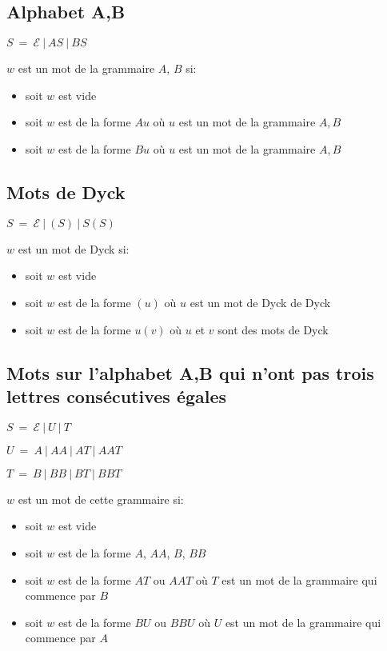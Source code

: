 \documentclass[a4paper, titlepage]{article}
\begin{document}
\subsection{Alphabet A,B}
\medskip
$ S\ =\ \mathcal{E}\ |\ AS\ |\ BS $ 

$w$ est un mot de la grammaire $A$, $B$ si:
\begin{itemize}
\item soit $w$ est vide
\item soit $w$ est de la forme $Au$ où $u$ est un mot de la grammaire
  $A,B$
\item soit $w$ est de la forme $Bu$ où $u$ est un mot de la grammaire
  $A,B$
\end{itemize}

\subsection{Mots de Dyck}
\medskip
$ S\ =\ \mathcal{E}\ |\ (S)\ |\ S(S) $ 

$w$ est un mot de Dyck si:
\begin{itemize}
\item soit $w$ est vide
\item soit $w$ est de la forme $(u)$ où $u$ est un mot de Dyck
  de Dyck
\item soit $w$ est de la forme $u(v)$ où $u$ et $v$ sont des mots de Dyck
\end{itemize}

\subsection{Mots sur l'alphabet A,B qui n'ont pas trois lettres
  consécutives égales}
\medskip
$ S\ =\ \mathcal{E}\ |\ U\ |\ T $

$ U\ =\ A\ |\ AA\ |\ AT\ |\ AAT$

$ T\ =\ B\ |\ BB\ |\ BT\ |\ BBT$

$w$ est un mot de cette grammaire si:
\begin{itemize}
\item soit $w$ est vide
\item soit $w$ est de la forme $A$, $AA$, $B$, $BB$
\item soit $w$ est de la forme $AT$ ou $AAT$ où $T$ est un mot de la grammaire
  qui commence par $B$
\item soit $w$ est de la forme $BU$ ou $BBU$ où $U$ est un mot de la grammaire
  qui commence par $A$

\end{itemize}
\end{document}
